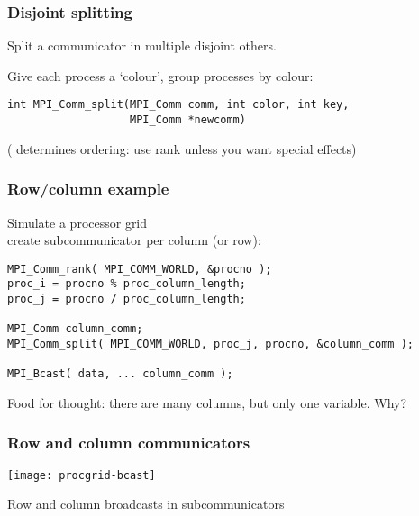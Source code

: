 

\begin{frame}[containsverbatim]\frametitle{Disjoint splitting}
  Split a communicator in multiple disjoint others.
  
Give each process a `colour', group processes by colour:
\lstset{language=C}
\begin{lstlisting}
int MPI_Comm_split(MPI_Comm comm, int color, int key, 
                   MPI_Comm *newcomm)  
\end{lstlisting}
( determines ordering: use rank unless you want special effects)
\end{frame}

\begin{frame}[containsverbatim]\frametitle{Row/column example}
  Simulate a processor grid\\
  create subcommunicator per column (or row):
\begin{lstlisting}
MPI_Comm_rank( MPI_COMM_WORLD, &procno );
proc_i = procno % proc_column_length;
proc_j = procno / proc_column_length;

MPI_Comm column_comm;
MPI_Comm_split( MPI_COMM_WORLD, proc_j, procno, &column_comm );

MPI_Bcast( data, ... column_comm );
\end{lstlisting}
Food for thought: there are many columns,
but only one  variable. Why?
\end{frame}

\begin{frame}[label=exprocgrid]\frametitle{Row and column communicators}
  \texttt{[image: procgrid-bcast]}

  Row and column broadcasts in subcommunicators
\end{frame}

\begin{exerciseframe}[procgrid]
  \footnotesize
  
\end{exerciseframe}

\begin{longcourse}
  \begin{exerciseframe}
    
  \end{exerciseframe}
\end{longcourse}

